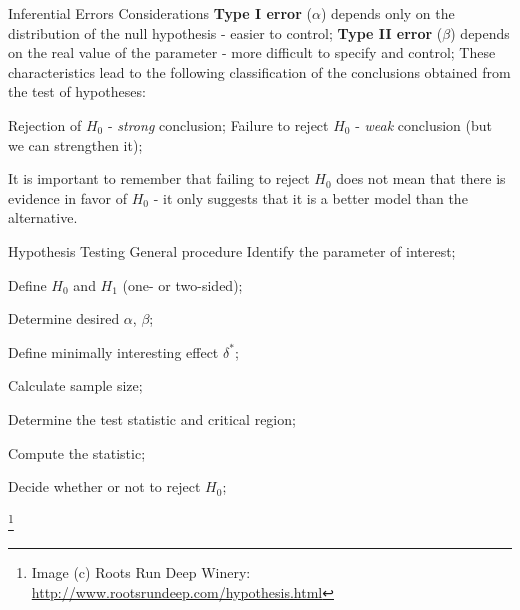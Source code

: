 \documentclass[t]{beamer}
\begin{document}

\begin{ftst}
{Inferential Errors}
{Considerations}
\textbf{Type I error} ($\alpha$) depends only on the distribution of the null hypothesis - easier to control;
\vone
\textbf{Type II error} ($\beta$) depends on the real value of the parameter - more difficult to specify and control;
\vone
These characteristics lead to the following classification of the conclusions obtained from the test of hypotheses:
\begin{block}{}
\bitems Rejection of $H_0$ - \textit{strong} conclusion; 
\spitem Failure to reject $H_0$ - \textit{weak} conclusion (but we can strengthen it);
\eitem
\end{block}
\vone
It is important to remember that failing to reject $H_0$ does not mean that there is evidence in favor of $H_0$ - it only suggests that it is a better model than the alternative.
\end{ftst}


\begin{ftst}
{Hypothesis Testing}
{General procedure}
\bitems Identify the parameter of interest;
	\item Define $H_0$ and $H_1$ (one- or two-sided);
	\item Determine desired $\alpha$, $\beta$;
	\item Define minimally interesting effect $\delta^*$;
	\item Calculate sample size;
	\item Determine the test statistic and critical region;
	\item Compute the statistic;
	\item Decide whether or not to reject $H_0$;
\eitem

\let\thefootnote\relax\footnote{\tiny Image (c) Roots Run Deep Winery: \url{http://www.rootsrundeep.com/hypothesis.html}}
\end{ftst}

\end{document}
